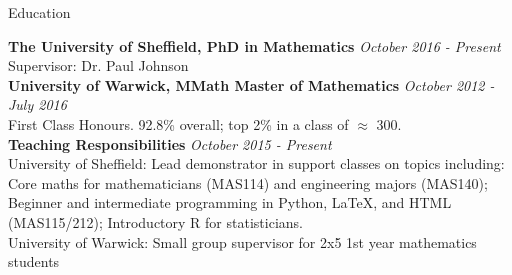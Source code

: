 \documentclass{zhresume} %
\begin{document}

\begin{rSection}{Education}

{\bf The University of Sheffield, PhD in Mathematics} \hfill {\em October 2016 - Present} \\ 
Supervisor: Dr. Paul Johnson \smallskip \\
{\bf University of Warwick, MMath Master of Mathematics} \hfill {\em October 2012 - July 2016} \\
First Class Honours. 92.8\% overall; top 2\% in a class of $\approx$ 300. \medskip \\
{\bf Teaching Responsibilities} \hfill {\em October 2015 - Present} \\
University of Sheffield: Lead demonstrator in support classes on topics including: \\
Core maths for mathematicians (MAS114) and engineering majors (MAS140); Beginner and intermediate programming in Python, LaTeX, and HTML (MAS115/212); Introductory R for statisticians. \\
University of Warwick: Small group supervisor for 2x5 1st year mathematics students

\end{rSection}

\end{document}
